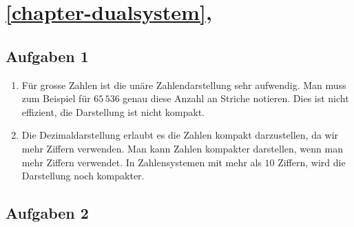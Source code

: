 \section{\autoref{chapter-dualsystem}, }

\subsection*{Aufgaben 1}

\begin{enumerate}
\item Für grosse Zahlen ist die unäre Zahlendarstellung sehr aufwendig. Man muss zum Beispiel für $65\,536$ genau diese Anzahl an Striche notieren. Dies ist nicht effizient, die Darstellung ist nicht kompakt. 
\item Die Dezimaldarstellung erlaubt es die Zahlen kompakt darzustellen, da wir mehr Ziffern verwenden. Man kann Zahlen kompakter darstellen, wenn man mehr Ziffern verwendet. In Zahlensystemen mit mehr als $10$ Ziffern, wird die Darstellung noch kompakter.
\end{enumerate}


\subsection*{Aufgaben 2}

